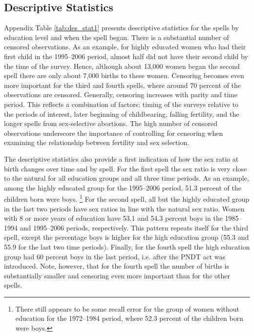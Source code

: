 \documentclass[12pt,letterpaper]{article}
\begin{document}
\subsection{Descriptive Statistics}

Appendix Table \ref{tab:des_stat1} presents descriptive statistics for
the spells by education level and when the spell began.
There is a substantial number of censored observations.
As an example, for highly educated women who had their first child in the 1995--2006
period, almost half did not have their second child by the time of the survey.
Hence, although about 13,000 women began the second spell 
there are only about 7,000 births to these women.
Censoring becomes even more important for the third and fourth
spells, where around 70 percent of the observations are censored.
Generally, censoring increases with parity and time period.
This reflects a combination of factors: timing of the surveys
relative to the periods of interest, later beginning of childbearing, 
falling fertility, and the longer spells from sex-selective abortions.
The high number of censored observations underscore the importance of controlling for
censoring when examining the relationship between fertility and sex selection.

The descriptive statistics also provide a first indication of how the
sex ratio at birth changes over time and by spell.
For the first spell the sex ratio is very close to the natural
for all education groups and all three time periods.
As an example, among the highly educated group for the 1995--2006 period,
51.3 percent of the children born were boys.%
\footnote{
There still appears to be some recall error for the group of women without
education for the 1972--1984 period, where 52.3 percent of the children born were boys.
}
For the second spell, all but the highly educated group in the last two
periods have sex ratios in line with the natural sex ratio.
Women with 8 or more years of education have 53.1 and 54.3 percent
boys in the 1985--1994 and 1995--2006 periods, respectively.
This pattern repeats itself for the third spell, except the percentage
boys is higher for the high education group (55.3 and 55.9 for the last
two time periods).
Finally, for the fourth spell the high education group 
had 60 percent boys in the last period, i.e. after the PNDT act was introduced.
Note, however, that for the fourth spell the number of births is substantially
smaller and censoring even more important than for the other spells.
\end{document}
